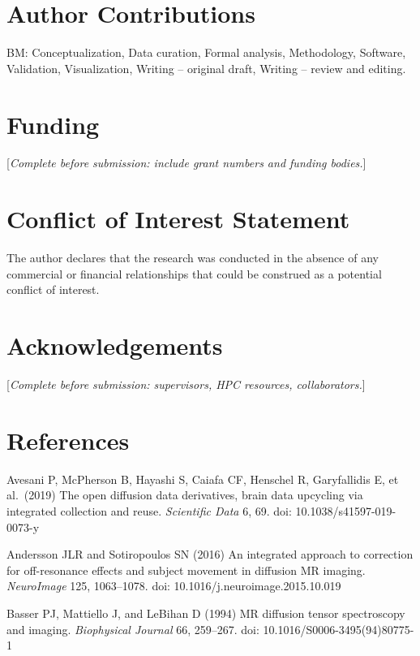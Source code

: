 \documentclass[12pt,a4paper]{article}
\begin{document}
\section{Author Contributions}\label{author-contributions}

BM: Conceptualization, Data curation, Formal analysis, Methodology, Software, Validation, Visualization, Writing -- original draft, Writing -- review and editing.

\section{Funding}\label{funding}

{[}\emph{Complete before submission: include grant numbers and funding bodies.}{]}

\section{Conflict of Interest Statement}\label{conflict-of-interest-statement}

The author declares that the research was conducted in the absence of any commercial or financial relationships that could be construed as a potential conflict of interest.

\section{Acknowledgements}\label{acknowledgements}

{[}\emph{Complete before submission: supervisors, HPC resources, collaborators.}{]}

\section{References}\label{references}

Avesani P, McPherson B, Hayashi S, Caiafa CF, Henschel R, Garyfallidis E, et al.~(2019) The open diffusion data derivatives, brain data upcycling via integrated collection and reuse. \emph{Scientific Data} 6, 69. doi: 10.1038/s41597-019-0073-y

Andersson JLR and Sotiropoulos SN (2016) An integrated approach to correction for off-resonance effects and subject movement in diffusion MR imaging. \emph{NeuroImage} 125, 1063--1078. doi: 10.1016/j.neuroimage.2015.10.019

Basser PJ, Mattiello J, and LeBihan D (1994) MR diffusion tensor spectroscopy and imaging. \emph{Biophysical Journal} 66, 259--267. doi: 10.1016/S0006-3495(94)80775-1
\end{document}
